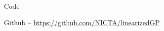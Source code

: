 \documentclass[final]{beamer}
\newlength{\onecolwid}
\begin{document}
\begin{frame}[t]
\begin{columns}[t]
\begin{column}{\onecolwid}
\vspace{-2cm}
\begin{alertblock}{Code}

Github -- \href{https://github.com/NICTA/linearizedGP}
                 {https://github.com/NICTA/linearizedGP}
\end{alertblock}


\end{column} %

\end{columns} %

\end{frame} %
\end{document}

